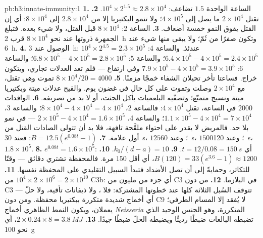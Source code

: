\begin{solution}{pb:b3:innate-immunity:1}
\textbf{1.} الساعة الواحدة $1.5$ تضاعف: $10^{4}\times 2^{1.5} \approx
2.8\times 10^{4}$.
\textbf{2.} تقتل $2\times 10^{4}$  ما يصل إلى $4\times 10^{5}$؛
ولا تنمو البكتيريا إلا من $2.8\times 10^{4}$ إلى $8\times 10^{4}$:
أي إن القتل يفوق النمو خمسة أضعاف.
\textbf{3.} الساعة 2: $8\times 10^{4}$ قبل القتل، ولا شيء بعده.
فتبلغ الجمهرة ذروتها عند نحو $8\times 10^{4}$ قرب \qty{2}{h}
وتكون صفرًا من ثَمّ؛ ولا يبقى منها شيء عند \qty{6}{h}.
\textbf{4.} الوصول عند \qty{3}{h}: $10^{4}\times 2^{4.5} = 2.3\times
10^{5}$ عندئذ. والساعة 4: $6.4\times 10^{5} - 4\times 10^{5} = 2.4\times
10^{5}$؛ والساعة 5: $6.8\times 10^{5} - 4\times 10^{5} = 2.8\times 10^{5}$؛
والساعة 6: $7.9\times 10^{5} - 4\times 10^{5} = 3.9\times 10^{5}$ وفي
ارتفاع --- فلم تعد العدلات تجاري، ويتكون خراج. فساعتا تأخر
تحيلان الشفاء خمجًا مزمنًا.
\textbf{5.} $8\times 10^{4}/20 = 4000$  تموت وهي تقتل، مع
$2\times 10^{4}$ وصلت وتموت على كل حال في غضون يوم. والقيح عدلات
ميتة وبكتيريا ميتة ونسيج متميّع؛ وتصفّيه البلعميات بأكل
الجثث، أو لا بد من تصريفه.
\textbf{6.} الوافدات $2000$ في الساعة، تقتل $4\times 10^{4}$: فالساعة 2،
$8\times 10^{4} - 4\times 10^{4} = 4\times 10^{4}$؛ والساعة 3، $1.1\times
10^{5} - 4\times 10^{4} = 7\times 10^{4}$؛ والساعة 4، $2\times 10^{5} -
4\times 10^{4} = 1.6\times 10^{5}$ --- في نمو بلا حد. فالمريض لا
يقدر على احتواء ملقَّحة تافهة، فلا بد أن تتولى الصادات
القتل من أول علامة.
\textbf{7.} $B = 12.5(e^{0.08t} - 1)$: فعند \qty{30}{s}، $125$؛ وعند \qty{60}{s}،
$1500$؛ وعند \qty{120}{s}، $1.8\times 10^{5}$.
\textbf{8.} $e^{0.08t} = 1.6\times 10^{5}$: أي $t = 12/0.08 = \qty{150}{s}$.
\textbf{9.} $k_{0}/(d - a) = 10$.
\textbf{10.} $B(120) = 33(e^{3.6} - 1) \approx 1200$، أي أقل $150$ مرة.
فالمحفظة تشتري دقائق --- وقتًا للتكاثر، وحمايةً إلى أن تصل
الأضداد فتبدأ السبيل التقليدي على المحفظة نفسها.
\textbf{11.} $10^{4}\times 2\times 10^{6} = 2\times 10^{10}$ من C3b: أي
جزء من مليون من C3 في البلازما.
\textbf{12.} من دون C3 تتوقف السُبل الثلاثة كلها عند خطوتها
المشتركة: فلا ، ولا ذيفانات تأقية، ولا حلّ --- أي
أخماج شديدة متكررة ببكتيريا محفظة. ومن دون C9 لا يُفقد إلا
المسام الطرفي؛   يعملان، ويكون النمط
الظاهري أخماج \emph{Neisseria} المتكررة، وهو الجنس الوحيد
الذي تضبطه البالعات ضبطًا رديئًا ويضبطه الحلّ ضبطًا جيدًا.
\textbf{13.} $2\times 0.24\times 8 = \qty{3.8}{MJ}$، أي نحو \qty{100}{g}

\end{solution}
